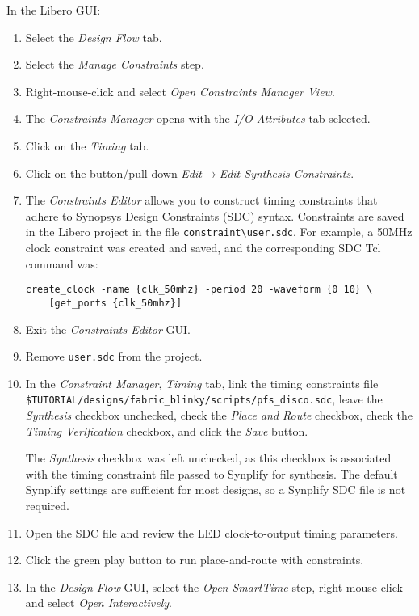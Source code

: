 In the Libero GUI:
%
\begin{enumerate}
\item Select the \emph{Design Flow} tab.
\item Select the \emph{Manage Constraints} step.
\item Right-mouse-click and select \emph{Open Constraints Manager View}.
\item The \emph{Constraints Manager} opens with the \emph{I/O Attributes}
tab selected.
\item Click on the \emph{Timing} tab.
\item Click on the button/pull-down \emph{Edit$\rightarrow$Edit Synthesis Constraints}.
\item The \emph{Constraints Editor} allows you to construct timing constraints
that adhere to Synopsys Design Constraints (SDC) syntax.
Constraints are saved in the Libero project in the file
\verb+constraint\user.sdc+. For example, a 50MHz clock constraint was
created and saved, and the corresponding SDC Tcl command was:
%
\begin{verbatim}
create_clock -name {clk_50mhz} -period 20 -waveform {0 10} \
    [get_ports {clk_50mhz}]
\end{verbatim}

\item Exit the \emph{Constraints Editor} GUI.
\item Remove \verb+user.sdc+ from the project.
\item In the \emph{Constraint Manager}, \emph{Timing} tab, link the
timing constraints file\newline
\verb+$TUTORIAL/designs/fabric_blinky/scripts/pfs_disco.sdc+,\newline %
leave the \emph{Synthesis} checkbox unchecked,
check the \emph{Place and Route} checkbox,
check the \emph{Timing Verification} checkbox,
and click the \emph{Save} button.

The \emph{Synthesis} checkbox was left unchecked, as this checkbox is associated
with the timing constraint file passed to Synplify for synthesis. The default
Synplify settings are sufficient for most designs, so a Synplify SDC file
is not required.

\item Open the SDC file and review the LED clock-to-output timing parameters.

\item Click the green play button to run place-and-route with constraints.

\item In the \emph{Design Flow} GUI, select the \emph{Open SmartTime} step,
right-mouse-click and select \emph{Open Interactively}.
\end{enumerate}

